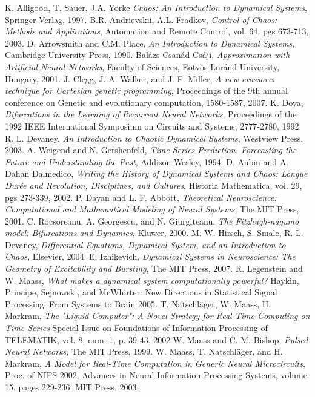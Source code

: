\documentclass[12pt]{article}
\begin{document}
\begin{thebibliography}{widest-label}
 K. Alligood, T. Sauer, J.A. Yorke
 \emph{Chaos:  An Introduction to Dynamical Systems},
 Springer-Verlag, 
 1997.
 B.R. Andrievskii, A.L. Fradkov,
 \emph{Control of Chaos: Methods and Applications},
 Automation and Remote Control,
 vol. 64,
 pgs 673-713,
 2003.
 D. Arrowsmith and C.M. Place,
 \emph{An Introduction to Dynamical Systems},
 Cambridge University Press,
 1990.
 Balázs Csanád Csáji,
 \emph{Approximation with Artificial Neural Networks},
 Faculty of Sciences,
 Eötvös Loránd University,
 Hungary,
 2001.
 J. Clegg, J. A. Walker, and J. F. Miller,
 \emph{A new crossover technique for Cartesian genetic programming},
 Proceedings of the 9th annual conference on Genetic and evolutionary computation,
 1580-1587,
 2007.
 K. Doya,
 \emph{Bifurcations in the Learning of Recurrent Neural Networks},
 Proceedings of the 1992 IEEE International Symposium on Circuits and Systems,
 2777-2780,
 1992.
 R. L. Devaney,
 \emph{An Introduction to Chaotic Dynamical Systems},
 Westview Press,
 2003.
 A. Weigend and N. Gershenfeld,
 \emph{Time Series Prediction.  Forecasting the Future and Understanding the Past},
 Addison-Wesley,
 1994.
 D. Aubin and A. Dahan Dalmedico,
 \emph{Writing the History of Dynamical Systems and Chaos:  Longue Dur\'ee and Revolution, Disciplines, and Cultures},
 Historia Mathematica,
 vol. 29,
 pgs 273-339,
 2002.
 P. Dayan and L. F. Abbott,
 \emph{Theoretical Neuroscience:  Computational and Mathematical Modeling of Neural Systems},
 The MIT Press,
 2001.
 C. Rocsoreanu, A. Georgescu, and N. Giurgiteanu,
 \emph{The Fitzhugh-nagumo model:  Bifurcations and Dynamics},
 Kluwer,
 2000.
 M. W. Hirsch, S. Smale, R. L. Devaney,
 \emph{Differential Equations, Dynamical System, and an Introduction to Chaos},
 Elsevier,
 2004.
 E. Izhikevich,
 \emph{Dynamical Systems in Neuroscience:  The Geometry of Excitability and Bursting},
 The MIT Press,
 2007.
 R. Legenstein and W. Maass,
 \emph{What makes a dynamical system computationally powerful?}
 Haykin, Principe, Sejnowski, and McWhirter:
 New Directions in Statistical Signal Processing:  From Systems to Brain
 2005.
 T. Natschl\"ager, W. Maass, H. Markram,
 \emph{The "Liquid Computer":  A Novel Strategy for Real-Time Computing on Time Series}
  Special Issue on Foundations of Information Processing of TELEMATIK, 
  vol. 8, 
  num. 1, 
  p. 39-43,
  2002 
 W. Maass and C. M. Bishop,
 \emph{Pulsed Neural Networks},
 The MIT Press,
 1999.
 W. Maass, T. Natschl\"ager, and H. Markram,
 \emph{A Model for Real-Time Computation in Generic Neural Microcircuits},
 Proc. of NIPS 2002, 
 Advances in Neural Information Processing Systems, 
 volume 15, 
 pages 229-236. 
 MIT Press, 
 2003.


\end{thebibliography}
\end{document}
